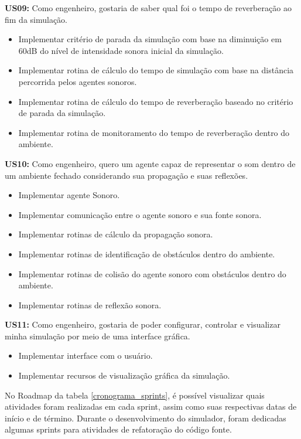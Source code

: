 \textbf{US09:} Como engenheiro, gostaria de saber qual foi o tempo de reverberação ao fim da simulação.

\begin{itemize}
\item Implementar critério de parada da simulação com base na diminuição em 60dB do nível de intensidade sonora inicial da simulação.
\item Implementar rotina de cálculo do tempo de simulação com base na distância percorrida pelos agentes sonoros.
\item Implementar rotina de cálculo do tempo de reverberação baseado no critério de parada da simulação.
\item Implementar rotina de monitoramento do tempo de reverberação dentro do ambiente.
\end{itemize}
	
\textbf{US10:} Como engenheiro, quero um agente capaz de representar o som dentro de um ambiente fechado considerando sua propagação e suas reflexões.

\begin{itemize}
\item Implementar agente Sonoro.
\item Implementar comunicação entre o agente sonoro e sua fonte sonora.
\item Implementar rotinas de cálculo da propagação sonora.
\item Implementar rotinas de identificação de obstáculos dentro do ambiente.
\item Implementar rotinas de colisão do agente sonoro com obstáculos dentro do ambiente.
\item Implementar rotinas de reflexão sonora.
\end{itemize}
	
\textbf{US11:} Como engenheiro, gostaria de poder configurar, controlar e visualizar minha simulação por meio de uma interface gráfica.

\begin{itemize}
\item Implementar interface com o usuário.
\item Implementar recursos de visualização gráfica da simulação.
\end{itemize}

No Roadmap da tabela \ref{cronograma_sprints}, é possível visualizar quais atividades foram realizadas em cada sprint, assim como suas respectivas datas de início e de término. Durante o desenvolvimento do simulador, foram dedicadas algumas sprints para atividades de refatoração do código fonte.

